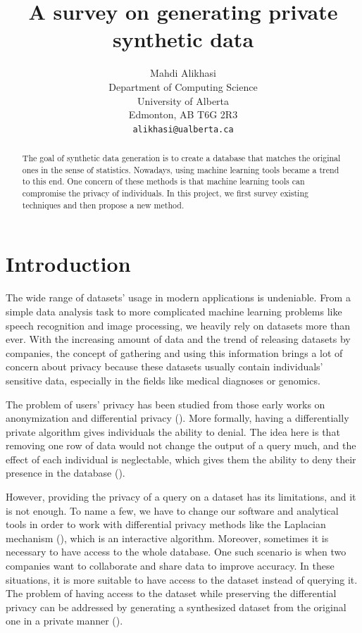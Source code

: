 \documentclass{article}
\title{A survey on generating private synthetic data}
\author{
  Mahdi Alikhasi \\
  Department of Computing Science\\
  University of Alberta\\
  Edmonton, AB T6G 2R3 \\
  \texttt{alikhasi@ualberta.ca} \\
}
\begin{document}
\maketitle

\begin{abstract}
The goal of synthetic data generation is to create a database that matches the original ones in the sense of statistics. Nowadays, using machine learning tools became a trend to this end. One concern of these methods is that machine learning tools can compromise the privacy of individuals. In this project, we first survey existing techniques and then propose a new method.
\end{abstract}

\section{Introduction}

The wide range of datasets' usage in modern applications is undeniable. From a simple data analysis task to more complicated machine learning problems like speech recognition and image processing, we heavily rely on datasets more than ever. With the increasing amount of data and the trend of releasing datasets by companies, the concept of gathering and using this information brings a lot of concern about privacy because these datasets usually contain individuals' sensitive data, especially in the fields like medical diagnoses or genomics.

The problem of users' privacy has been studied from those early works on anonymization and differential privacy (\cite{dwork2011firm}). More formally, having a differentially private algorithm gives individuals the ability to denial. The idea here is that removing one row of data would not change the output of a query much, and the effect of each individual is neglectable, which gives them the ability to deny their presence in the database (\cite{ullman2011pcps}).

However, providing the privacy of a query on a dataset has its limitations, and it is not enough. To name a few, we have to change our software and analytical tools in order to work with differential privacy methods like the Laplacian mechanism (\cite{dwork2006calibrating}), which is an interactive algorithm. Moreover, sometimes it is necessary to have access to the whole database. One such scenario is when two companies want to collaborate and share data to improve accuracy. In these situations, it is more suitable to have access to the dataset instead of querying it. The problem of having access to the dataset while preserving the differential privacy can be addressed by generating a synthesized dataset from the original one in a private manner (\cite{ullman2011pcps}).
\end{document}
